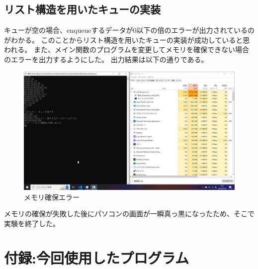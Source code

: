 \documentclass[dvipdfmx]{jsarticle}
\begin{document}
\subsection{リスト構造を用いたキューの実装}
キューが空の場合、enqueueするデータが0以下の倍のエラーが出力されているのがわかる。
このことからリスト構造を用いたキューの実装が成功していると思われる。
また、メイン関数のプログラムを変更してメモリを確保できない場合のエラーを出力するようにした。
出力結果は以下の通りである。
\begin{figure}[H]
  \centering
  \includegraphics[width=15cm]{./img/image.png}
  \caption{メモリ確保エラー}
\end{figure}
メモリの確保が失敗した後にパソコンの画面が一瞬真っ黒になったため、そこで実験を終了した。
\section{付録:今回使用したプログラム}



\end{document}
